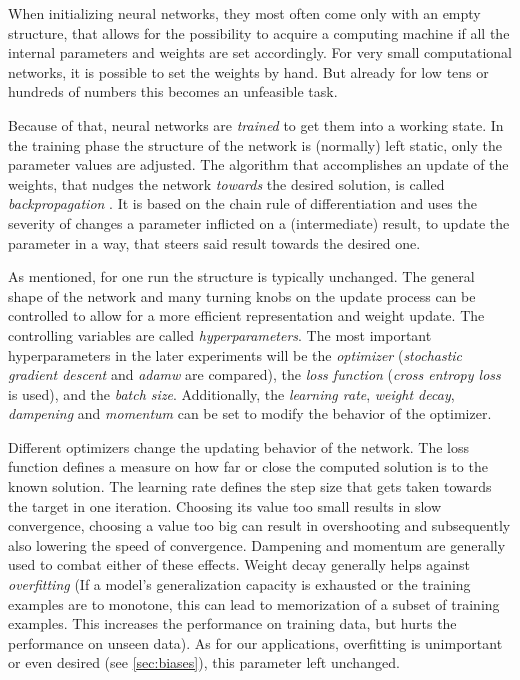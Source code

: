 When initializing neural networks, they most often come only with an empty structure, that allows for the possibility to acquire a computing machine if all the internal parameters and weights are set accordingly.
For very small computational networks, it is possible to set the weights by hand.
But already for low tens or hundreds of numbers this becomes an unfeasible task. 

Because of that, neural networks are \emph{trained} to get them into a working state. In the training phase the structure of the network is (normally) left static, only the parameter values are adjusted. 
The algorithm that accomplishes an update of the weights, that nudges the network \emph{towards} the desired solution, is called \emph{backpropagation} \cite{machineLearningMitchell}.
It is based on the chain rule of differentiation and uses the severity of changes a parameter inflicted on a (intermediate) result, to update the parameter in a way, that steers said result towards the desired one. 

As mentioned, for one run the structure is typically unchanged. 
The general shape of the network and many turning knobs on the update process can be controlled to allow for a more efficient representation and weight update.
The controlling variables are called \emph{hyperparameters}.
The most important hyperparameters in the later experiments will be the \emph{optimizer} (\emph{stochastic gradient descent} and \emph{adamw} \cite{adamwOptimizer} are compared), the \emph{loss function} (\emph{cross entropy loss} is used), and the \emph{batch size}. 
Additionally, the \emph{learning rate}, \emph{weight decay}, \emph{dampening} and \emph{momentum} can be set to modify the behavior of the optimizer.

Different optimizers change the updating behavior of the network. 
The loss function defines a measure on how far or close the computed solution is to the known solution.
The learning rate defines the step size that gets taken towards the target in one iteration.
Choosing its value too small results in slow convergence, choosing a value too big can result in overshooting and subsequently also lowering the speed of convergence.
Dampening and momentum are generally used to combat either of these effects.
Weight decay generally helps against \emph{overfitting} (If a model's generalization capacity is exhausted or the training examples are to monotone, this can lead to memorization of a subset of training examples. This increases the performance on training data, but hurts the performance on unseen data). 
As for our applications, overfitting is unimportant or even desired (see \autoref{sec:biases}), this parameter left unchanged.

